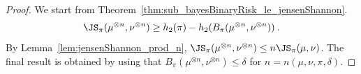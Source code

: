 \begin{proof}%
{}
We start from Theorem~\ref{thm:sub_bayesBinaryRisk_le_jensenShannon}.
\begin{align*}
\JS_\pi(\mu^{\otimes n}, \nu^{\otimes n}) \ge h_2(\pi) - h_2(B_\pi(\mu^{\otimes n}, \nu^{\otimes n})) \: .
\end{align*}
By Lemma~\ref{lem:jensenShannon_prod_n}, $\JS_\pi(\mu^{\otimes n}, \nu^{\otimes n}) \le n \JS_\pi(\mu, \nu)$. The final result is obtained by using that $B_\pi(\mu^{\otimes n}, \nu^{\otimes n}) \le \delta$ for $n = n(\mu, \nu, \pi, \delta)$.
\end{proof}

